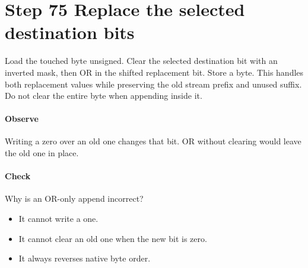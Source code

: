 \section{Step 75 Replace the selected destination bits}\label{h263-writer-s05}
Load the touched byte unsigned. Clear the selected destination bit with an
inverted mask, then OR in the shifted replacement bit. Store a byte. This handles
both replacement values while preserving the old stream prefix and unused suffix.
Do not clear the entire byte when appending inside it.

\paragraph{Observe} Writing a zero over an old one changes that bit. OR without
clearing would leave the old one in place.
\paragraph{Check} Why is an OR-only append incorrect?
\begin{itemize}
  \item[A.] It cannot write a one.
  \item[B.] It cannot clear an old one when the new bit is zero.
  \item[C.] It always reverses native byte order.
\end{itemize}
